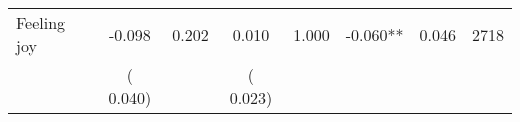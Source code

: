 \begin{tabular}{l*{7}{c}}
 Feeling joy       &             -0.098       &        0.202  &              0.010       &        1.000  &             -0.060**       &              0.046 &  2718 \\ 
                       &       (       0.040)             &                               &       (       0.023)                     &                               &                                               &                                &                      \\ 

\hline \end{tabular}